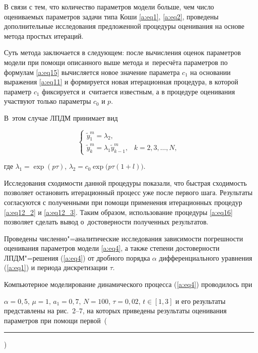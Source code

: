 В связи с тем, что количество параметров модели больше, чем число оцениваемых параметров задачи типа Коши \eqref{a:eq1}, \eqref{a:eq2}, проведены дополнительные исследования предложенной процедуры оценивания на основе метода простых итераций. 

Суть метода заключается в следующем: после вычисления оценок параметров модели при помощи описанного выше метода и~пересчёта параметров по формулам \eqref{a:eq15} вычисляется новое значение параметра $c_1$ на основании выражения \eqref{a:eq11} и формируется новая итерационная процедура, в которой параметр $c_1$ фиксируется и~считается известным, а в процедуре оценивания участвуют только параметры $c_0$ и $p$. 

В~этом случае ЛПДМ принимает вид

\begin{equation}

\label{a:eq16}

\left\{ \begin{array}{ll}

\tilde{y}^m_1= \lambda_2, 	\\

\tilde{y}^m_k= \lambda_1\tilde{y}^m_{k-1}, & k=2, 3, \dots, N ,

\end{array}

\right.

\end{equation}

где $ \lambda_1=\exp(p\tau)$, $\lambda_2=c_0 \exp\bigl(p\tau(1+l)\bigr)$.

Исследования сходимости данной процедуры показали, что быстрая сходимость позволяет остановить итерационный процесс уже после первого шага. Результаты согласуются с полученными при помощи применения итерационных процедур \eqref{a:eq12_2} и \eqref{a:eq12_3}. Таким образом, использование процедуры \eqref{a:eq16} позволяет сделать вывод о~достоверности полученных результатов.



Проведены численно"=аналитические исследования зависимости погрешности оценивания параметров модели \eqref{a:eq4}, а также степени достоверности ЛПДМ"=решения (\ref{a:eq4}) от дробного порядка $\alpha$ дифференциального уравнения (\ref{a:eq1}) и периода дискретизации $\tau$.



Компьютерное моделирование динамического процесса (\ref{a:eq4}) проводилось при 

$\alpha=0,5$, $\mu=1$, $a_1=0,7$, $N=100$, $\tau=0,02$, $t \in [1, 3]$ и его результаты представлены на рис.~2--7, на которых приведены результаты оценивания параметров при помощи первой~(\rule{4pt}{4pt})

